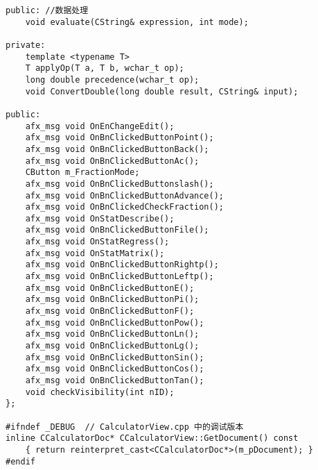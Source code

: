 \begin{lstlisting}
public: //数据处理
    void evaluate(CString& expression, int mode);

private:
    template <typename T>
    T applyOp(T a, T b, wchar_t op);
    long double precedence(wchar_t op);
    void ConvertDouble(long double result, CString& input);
    
public:
    afx_msg void OnEnChangeEdit();
    afx_msg void OnBnClickedButtonPoint();
    afx_msg void OnBnClickedButtonBack();
    afx_msg void OnBnClickedButtonAc();
    CButton m_FractionMode;
    afx_msg void OnBnClickedButtonslash();
    afx_msg void OnBnClickedButtonAdvance();
    afx_msg void OnBnClickedCheckFraction();
    afx_msg void OnStatDescribe();
    afx_msg void OnBnClickedButtonFile();
    afx_msg void OnStatRegress();
    afx_msg void OnStatMatrix();
    afx_msg void OnBnClickedButtonRightp();
    afx_msg void OnBnClickedButtonLeftp();
    afx_msg void OnBnClickedButtonE();
    afx_msg void OnBnClickedButtonPi();
    afx_msg void OnBnClickedButtonF();
    afx_msg void OnBnClickedButtonPow();
    afx_msg void OnBnClickedButtonLn();
    afx_msg void OnBnClickedButtonLg();
    afx_msg void OnBnClickedButtonSin();
    afx_msg void OnBnClickedButtonCos();
    afx_msg void OnBnClickedButtonTan();
    void checkVisibility(int nID);
};

#ifndef _DEBUG  // CalculatorView.cpp 中的调试版本
inline CCalculatorDoc* CCalculatorView::GetDocument() const
    { return reinterpret_cast<CCalculatorDoc*>(m_pDocument); }
#endif    
\end{lstlisting}

